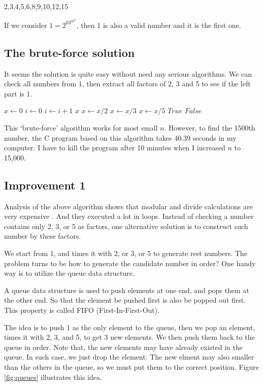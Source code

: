 \documentclass{article}
\begin{document}
2,3,4,5,6,8,9,10,12,15

If we consider $1=2^03^05^0$, then 1 is also a valid number and it is
the first one.

\subsection{The brute-force solution}
It seems the solution is quite easy without need any serious algorithms.
We can check all numbers from 1, then extract all factors of 2, 3 and 5
to see if the left part is 1.

\begin{algorithmic}[1]
  \State $x \gets 0$
  \State $i \gets 0$
  \Loop
      \State $i \gets i + 1$
        \State \Return $x$
      \EndIf
    \EndIf
  \EndLoop
\EndFunction
\Statex
{}
    \State $x \gets x / 2$
  \EndWhile
    \State $x \gets x / 3$
  \EndWhile
    \State $x \gets x / 5$
  \EndWhile
    \State \Return $True$
  \Else
    \State \Return $False$
  \EndIf
\EndFunction
\end{algorithmic}

This `brute-force' algorithm works for most small $n$. However, to find
the 1500th number, the C program based on this algorithm takes 40.39 seconds
in my computer. I have to kill the program after 10 minutes when I
increased $n$ to 15,000.

\subsection{Improvement 1}
Analysis of the above algorithm shows that modular and divide calculations
are very expensive \cite{Bentley}. And they executed a lot in loops.
Instead of checking a number contains only 2, 3, or 5 as factors, one
alternative solution is to construct such number by these factors.

We start from 1, and times it with 2, or 3, or 5 to generate rest numbers.
The problem turns to be how to generate the candidate number in order?
One handy way is to utilize the queue data structure.

A queue data structure is used to push elements at one end, and pops
them at the other end. So that the element be pushed first is also
be popped out first. This property is called FIFO (First-In-First-Out).

The idea is to push 1 as the only element to the queue, then we pop
an element, times it with 2, 3, and 5, to get 3 new elements. We
then push them back to the queue in order. Note that, the new elements may
have already existed in the queue. In such case, we just drop the
element. The new elment may also smaller than the others in the queue,
so we must put them to the correct position. Figure \ref{fig:queues} 
illustrates this idea.
\end{document}
